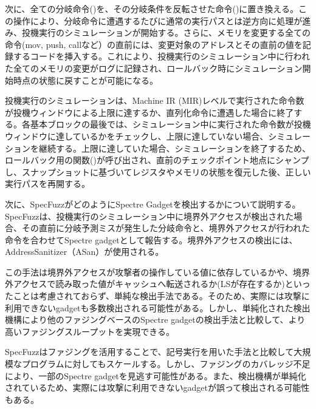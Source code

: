 次に、全ての分岐命令()を、その分岐条件を反転させた命令()に置き換える。この操作により、分岐命令に遭遇するたびに通常の実行パスとは逆方向に処理が進み、投機実行のシミュレーションが開始する。さらに、メモリを変更する全ての命令(mov, push, callなど）の直前には、変更対象のアドレスとその直前の値を記録するコードを挿入する。これにより、投機実行のシミュレーション中に行われた全てのメモリの変更がログに記録され、ロールバック時にシミュレーション開始時点の状態に戻すことが可能になる。\par
投機実行のシミュレーションは、Machine IR (MIR)レベルで実行された命令数が投機ウィンドウによる上限に達するか、直列化命令に遭遇した場合に終了する。各基本ブロックの最後では、シミュレーション中に実行された命令数が投機ウィンドウに達しているかをチェックし、上限に達していない場合、シミュレーションを継続する。上限に達していた場合、シミュレーションを終了するため、ロールバック用の関数()が呼び出され、直前のチェックポイント地点にシャンプし、スナップショットに基づいてレジスタやメモリの状態を復元した後、正しい実行パスを再開する。\par
次に、SpecFuzzがどのようにSpectre Gadgetを検出するかについて説明する。SpecFuzzは、投機実行のシミュレーション中に境界外アクセスが検出された場合、その直前に分岐予測ミスが発生した分岐命令と、境界外アクセスが行われた命令を合わせてSpectre gadgetとして報告する。境界外アクセスの検出には、AddressSanitizer（ASan）\cite{serebryany2012addresssanitizer}が使用される。\par
この手法は境界外アクセスが攻撃者の操作している値に依存しているかや、境界外アクセスで読み取った値がキャッシュへ転送されるか(LSが存在するか)といったことは考慮されておらず、単純な検出手法である。そのため、実際には攻撃に利用できないgadgetも多数検出される可能性がある\cite{qi2021spectaint}。しかし、単純化された検出機構により他のファジングベースのSpectre gadgetの検出手法\cite{qi2021spectaint,johannesmeyer2022kasper}と比較して、より高いファジングスループットを実現できる。\par

SpecFuzzはファジングを活用することで、記号実行を用いた手法と比較して大規模なプログラムに対してもスケールする。しかし、ファジングのカバレッジ不足により、一部のSpectre gadgetを見逃す可能性がある。また、検出機構が単純化されているため、実際には攻撃に利用できないgadgetが誤って検出される可能性もある。
